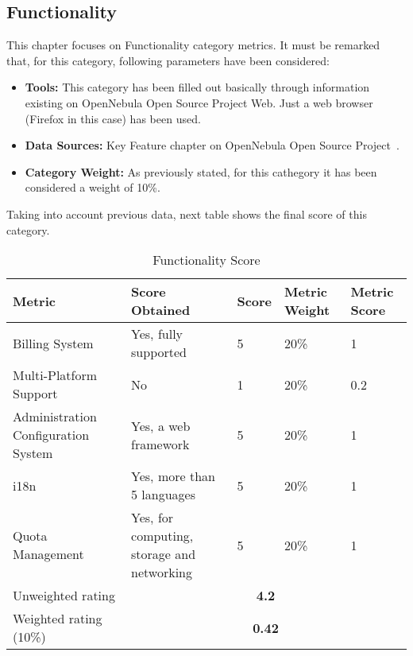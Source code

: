 \documentclass[11pt]{article}
\begin{document}
\subsection{Functionality}
This chapter focuses on Functionality category metrics. It must be remarked that, for this category, following parameters have been considered:
\begin{itemize}\itemsep0pt
\item{\textbf{Tools:}} This category has been filled out basically through information existing on OpenNebula Open Source Project Web. Just a web browser (Firefox in this case) has been used.
\item{\textbf{Data Sources:}} Key Feature chapter on OpenNebula Open Source Project~\cite{OPNEB00}.
\item{\textbf{Category Weight:}} As previously stated, for this cathegory it has been considered a weight of 10\%.
\end{itemize}
Taking into account previous data, next table shows the final score of this category.
\begin{table}[H]
  \begin{center}
    \begin{tabular}{ | p{4cm} | p{3cm} | l | p{1.2cm} | p{1.2cm} | }
    \hline
    \textbf{Metric} & \textbf{Score Obtained} & \textbf{Score} & \textbf{Metric Weight} & \textbf{Metric Score}\\
    \hline
    Billing System & Yes, fully supported & 5 & 20\% & 1\\
    \hline
    Multi-Platform Support & No & 1 & 20\% & 0.2\\
    \hline
    Administration Configuration System & Yes, a web framework & 5 & 20\% & 1\\
    \hline
    i18n & Yes, more than 5 languages & 5 & 20\% & 1\\
    \hline
    Quota Management & Yes, for computing, storage and networking & 5 & 20\% & 1\\
    \hline
    Unweighted rating & \multicolumn{4}{c|}{\textbf{4.2}}\\
    \hline
    Weighted rating (10\%) & \multicolumn {4}{c|}{\textbf{0.42}}\\
    \hline
    \end{tabular}
    \caption{Functionality Score}
    \label{tab:func_score}
  \end{center}
\end{table}
\end{document}

